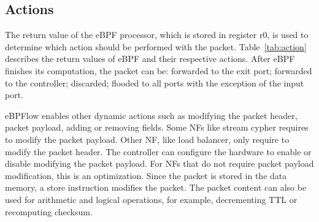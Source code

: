 \subsection{Actions}

\begin{table}[ht]
\centering
\caption{Action performed on the packets.}
\label{tab:action}
\end{table}


The return value of the eBPF processor, which is stored in register r0, is used to determine which action should be performed with the packet. Table~\ref{tab:action} describes the return values of eBPF and their respective actions. After eBPF finishes its computation, the packet can be: forwarded to the exit port; forwarded to the controller; discarded; flooded to all ports with the exception of the input port.


eBPFlow enables other dynamic actions such as modifying the packet header, packet payload, adding or removing fields.
Some NFs like stream cypher requires to modify the packet payload. Other NF, like load balancer, only require to modify the packet header. The controller can configure the hardware to enable or disable modifying the packet payload. For NFs that do not require packet payload modification, this is an optimization.
Since the packet is stored in the data memory, a store instruction modifies the packet. The packet content can also be used for arithmetic and logical operations, for example, decrementing TTL or recomputing checksum.

